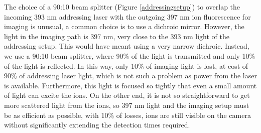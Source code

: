 The choice of a 90:10 beam splitter (Figure \ref{addressingsetup}) to overlap the incoming 393 nm addressing laser with the outgoing 397 nm ion fluorescence for imaging is unusual, a common choice is to use a dichroic mirror. However, the light in the imaging path is 397 nm, very close to the 393 nm light of the addressing setup. This would have meant using a very narrow dichroic. Instead, we use a 90:10 beam splitter, where 90\% of the light is transmitted and only 10\% of the light is reflected. In this way, only 10\% of imaging light is lost, at cost of 90\% of addressing laser light, which is not such a problem as power from the laser is available. Furthermore, this light is focused so tightly that even a small amount of light can excite the ions. On the other end, it is not so straightforward to get more scattered light from the ions, so 397 nm light and the imaging setup must be as efficient as possible, with 10\% of losses, ions are still visible on the camera without significantly extending the detection times required.

